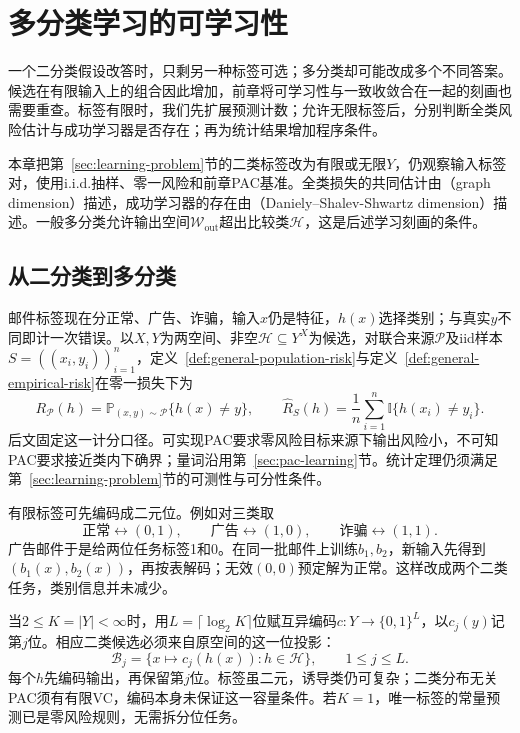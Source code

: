 \chapter{多分类学习的可学习性}
\label{chap:multiclass-learnability}

一个二分类假设改答时，只剩另一种标签可选；多分类却可能改成多个不同答案。候选在有限输入上的组合因此增加，前章将可学习性与一致收敛合在一起的刻画也需要重查。标签有限时，我们先扩展预测计数；允许无限标签后，分别判断全类风险估计与成功学习器是否存在；再为统计结果增加程序条件。

本章把第~\ref{sec:learning-problem}节的二类标签改为有限或无限$Y$，仍观察输入标签对，使用i.i.d.抽样、零一风险和前章PAC基准。全类损失的共同估计由（graph dimension）描述，成功学习器的存在由（Daniely--Shalev-Shwartz dimension）描述。一般多分类允许输出空间$\mathcal W_{\mathrm{out}}$超出比较类$\mathcal H$，这是后述学习刻画的条件。

\section{从二分类到多分类}
\label{sec:multiclass-setting}

邮件标签现在分正常、广告、诈骗，输入$x$仍是特征，$h(x)$选择类别；与真实$y$不同即计一次错误。以$X,Y$为两空间、非空$\mathcal H\subseteq Y^X$为候选，对联合来源$\mathcal P$及iid样本$S=((x_i,y_i))_{i=1}^n$，定义~\ref{def:general-population-risk}与定义~\ref{def:general-empirical-risk}在零一损失下为
\begin{equation}
 R_{\mathcal P}(h)=\mathbb P_{(x,y)\sim\mathcal P}\{h(x)\neq y\},\qquad
 \hat R_S(h)=\frac1n\sum_{i=1}^n\mathbb I\{h(x_i)\neq y_i\}.
 \label{eq:multiclass-risk}
\end{equation}
后文固定这一计分口径。可实现PAC要求零风险目标来源下输出风险小，不可知PAC要求接近类内下确界；量词沿用第~\ref{sec:pac-learning}节。统计定理仍须满足第~\ref{sec:learning-problem}节的可测性与可分性条件。

有限标签可先编码成二元位。例如对三类取
\[
 \text{正常}\longleftrightarrow(0,1),\qquad
 \text{广告}\longleftrightarrow(1,0),\qquad
 \text{诈骗}\longleftrightarrow(1,1).
\]
广告邮件于是给两位任务标签1和0。在同一批邮件上训练$b_1,b_2$，新输入先得到$(b_1(x),b_2(x))$，再按表解码；无效$(0,0)$预定解为正常。这样改成两个二类任务，类别信息并未减少。

当$2\leq K=|Y|<\infty$时，用$L=\lceil\log_2K\rceil$位赋互异编码$c:Y\to\{0,1\}^L$，以$c_j(y)$记第$j$位。相应二类候选必须来自原空间的这一位投影：
\[
 \mathcal B_j=\{x\mapsto c_j(h(x)):h\in\mathcal H\},\qquad 1\leq j\leq L.
\]
每个$h$先编码输出，再保留第$j$位。标签虽二元，诱导类仍可复杂；二类分布无关PAC须有有限VC，编码本身未保证这一容量条件。若$K=1$，唯一标签的常量预测已是零风险规则，无需拆分位任务。

